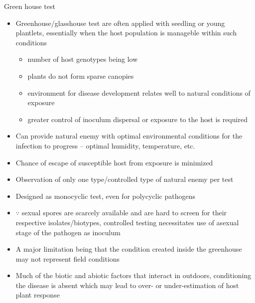 \documentclass[11pt,dvipsnames,ignorenonframetext,aspectratio=169]{beamer}
\providecommand{\tightlist}{%
  \setlength{\itemsep}{0pt}\setlength{\parskip}{0pt}}
\begin{document}
\begin{frame}{Green house test}
\protect\hypertarget{green-house-test}{}
\begin{itemize}
\tightlist
\item
  Greenhouse/glasshouse test are often applied with seedling or young
  plantlets, essentially when the host population is manageble within
  such conditions

  \begin{itemize}
  \tightlist
  \item
    number of host genotypes being low
  \item
    plants do not form sparse canopies
  \item
    environment for disease development relates well to natural
    conditions of exposure
  \item
    greater control of inoculum dispersal or exposure to the host is
    required
  \end{itemize}
\item
  Can provide natural enemy with optimal environmental conditions for
  the infection to progress -- optimal humidity, temperature, etc.
\item
  Chance of escape of susceptible host from exposure is minimized
\item
  Observation of only one type/controlled type of natural enemy per test
\item
  Designed as monocyclic test, even for polycyclic pathogens
\item
  \(\because\) sexual spores are scarcely available and are hard to
  screen for their respective isolates/biotypes, controlled testing
  necessitates use of asexual stage of the pathogen as inoculum
\item
  A major limitation being that the condition created inside the
  greenhouse may not represent field conditions
\item
  Much of the biotic and abiotic factors that interact in outdoors,
  conditioning the disease is absent which may lead to over- or
  under-estimation of host plant response
\end{itemize}
\end{frame}
\end{document}
